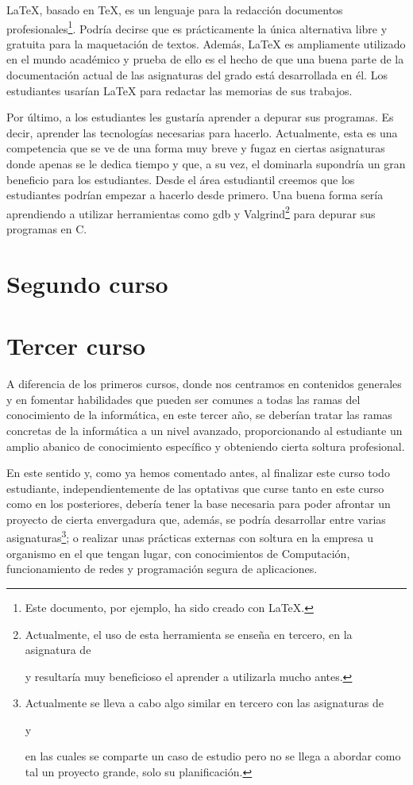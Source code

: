 \LaTeX, basado en \TeX, es un lenguaje para
la redacción documentos profesionales\footnote{
    Este documento, por ejemplo, ha sido creado con \LaTeX.
}.
Podría decirse que es prácticamente la única alternativa
libre y gratuita para la maquetación de textos.
Además, \LaTeX{} es ampliamente utilizado en el mundo académico y prueba de
ello es el hecho de que una buena parte de la documentación actual de las
 asignaturas del grado está desarrollada en él.
Los estudiantes usarían \LaTeX{} para redactar las memorias de sus trabajos.

Por último, a los estudiantes les gustaría aprender a depurar sus programas.
Es decir, aprender las tecnologías necesarias para hacerlo.
Actualmente, esta es una competencia que se ve de una forma muy breve y fugaz
en ciertas asignaturas donde apenas se le dedica tiempo y que, a su vez, el
dominarla supondría un gran beneficio para los estudiantes.
Desde el área estudiantil creemos que los estudiantes podrían empezar a
hacerlo desde primero.
Una buena forma sería
aprendiendo a utilizar herramientas como gdb y Valgrind\footnote{Actualmente,
 el uso de esta herramienta se enseña en tercero, en la asignatura de 
 \subject{Ampliación de Sistemas Operativos} y resultaría muy beneficioso el
 aprender a utilizarla mucho antes.} para depurar sus programas en C.

\section{Segundo curso}

\section{Tercer curso}
A diferencia de los primeros cursos, donde nos centramos en contenidos generales 
y en fomentar habilidades que pueden ser comunes a todas las ramas del conocimiento de 
la informática, en este tercer año, se deberían tratar las ramas concretas de la 
informática a un nivel avanzado, proporcionando al estudiante un amplio abanico de 
conocimiento específico y obteniendo cierta soltura profesional.

En este sentido y, como ya hemos comentado antes, al finalizar este curso todo estudiante, 
independientemente de las optativas que curse tanto en este curso como en los posteriores, 
debería tener la base necesaria para poder afrontar un proyecto de cierta envergadura que, 
además, se podría desarrollar entre varias asignaturas\footnote{Actualmente se lleva a cabo
algo similar en tercero con las asignaturas de \subject{Procesos de Desarrollo Software} y 
\subject{Gestión de Procesos de Desarrollo Software} en las cuales se comparte un caso de 
estudio pero no se llega a abordar como tal un proyecto grande, solo su planificación.}; 
o realizar unas prácticas externas con soltura en la empresa u organismo en el que tengan 
lugar, con conocimientos de Computación, funcionamiento de redes y programación segura de 
aplicaciones.

